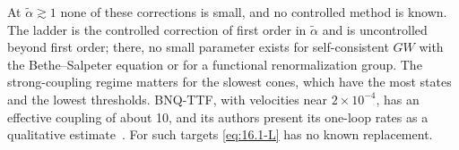 At $\tilde\alpha \gtrsim 1$ none of these corrections is small, and no controlled method is known. The ladder is the controlled correction of first order in $\tilde\alpha$ and is uncontrolled beyond first order; there, no small parameter exists for self-consistent $GW$ with the Bethe--Salpeter equation or for a functional renormalization group. The strong-coupling regime matters for the slowest cones, which have the most states and the lowest thresholds. BNQ-TTF, with velocities near $2\times10^{-4}$, has an effective coupling of about 10, and its authors present its one-loop rates as a qualitative estimate~\cite[footnote~3]{geilhufe2020dirac}. For such targets \cref{eq:16.1-L} has no known replacement.
